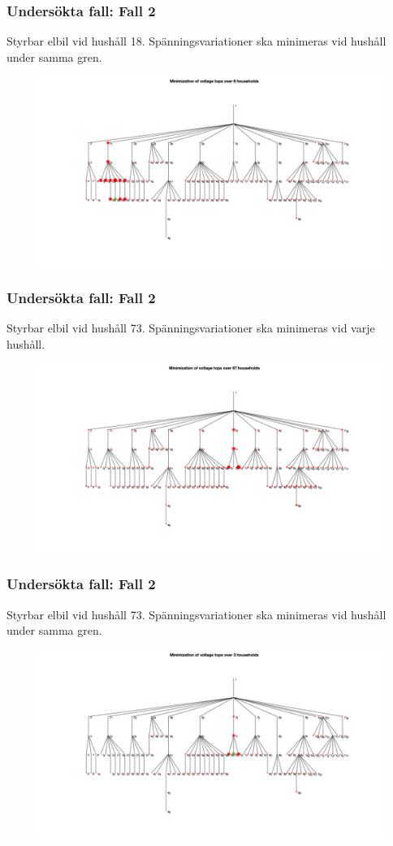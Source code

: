 \documentclass[noamsthm, swedish]{beamer}
\begin{document}
\begin{frame}
\frametitle{Undersökta fall: Fall 2}
Styrbar elbil vid hushåll 18. Spänningsvariationer ska minimeras vid hushåll under samma gren.
    \begin{figure}
        \centering
        \includegraphics[width = 0.83\linewidth]{templates/fig/tree_Uclust_18_pdf.pdf}
    \end{figure}
\end{frame}

\begin{frame}
\frametitle{Undersökta fall: Fall 2}
Styrbar elbil vid hushåll 73. Spänningsvariationer ska minimeras vid varje hushåll.
    \begin{figure}
        \centering
        \includegraphics[width = 0.83\linewidth]{templates/fig/tree_Uall_73_pdf.pdf}
    \end{figure}
\end{frame}

\begin{frame}
\frametitle{Undersökta fall: Fall 2}
Styrbar elbil vid hushåll 73. Spänningsvariationer ska minimeras vid hushåll under samma gren.
    \begin{figure}
        \centering
        \includegraphics[width = 0.83\linewidth]{templates/fig/tree_Uclust_73_pdf.pdf}
    \end{figure}
\end{frame}
\end{document}

